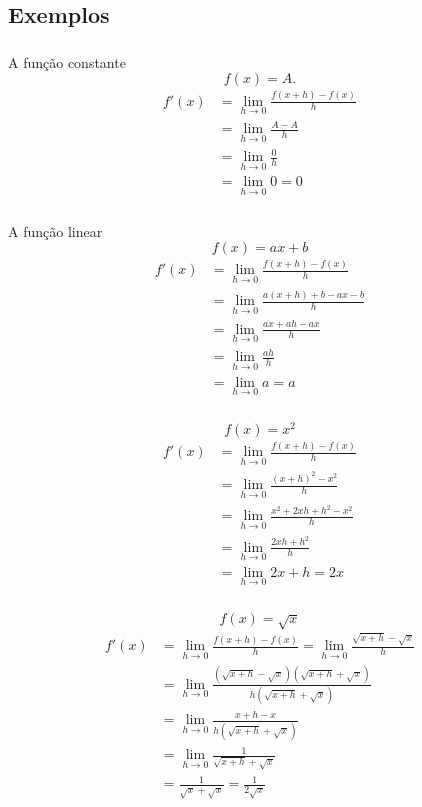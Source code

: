 \documentclass[10 pt]{beamer}
\newcommand{\myframe}[1]{
\begin{frame}
 \frametitle{\insertsection \qquad {\small \insertsubsection}}
#1
\end{frame}}
\newcommand{\limh}[1]{\lim_{h\rightarrow{#1}}}
\begin{document}
\subsection{Exemplos}

\myframe {
  A função constante
  $$ f(x) = A. $$
  \vspace{0.5cm}
  \begin{align*}
    f'(x) & = \limh{0}\frac{f(x+h)-f(x)}{h} \\
      & = \limh{0}\frac{A-A}{h} \\
      & = \limh{0}\frac{0}{h} \\
      & = \limh{0}0 = 0
  \end{align*}
}

\myframe {
  A função linear
  $$ f(x) = ax + b $$
  \vspace{0.5cm}
  \begin{align*}
    f'(x) & = \limh{0}\frac{f(x+h)-f(x)}{h} \\
      & = \limh{0}\frac{a(x+h)+b - ax-b}{h} \\
      & = \limh{0}\frac{ax+ah-ax}{h} \\
      & = \limh{0}\frac{ah}{h} \\
      & = \limh{0}a = a
  \end{align*}
}

\myframe {
  $$ f(x) = x^2 $$
  \vspace{0.5cm}
  \begin{align*}
    f'(x) & = \limh{0}\frac{f(x+h)-f(x)}{h} \\
      & = \limh{0}\frac{(x+h)^2 - x^2}{h} \\
      & = \limh{0}\frac{x^2+2xh+h^2 - x^2}{h} \\
      & = \limh{0}\frac{2xh + h^2}{h} \\
      & = \limh{0}2x + h = 2x
  \end{align*}
}

\myframe {
  $$ f(x) = \sqrt{x} $$
  \vspace{0.5cm}
  \begin{align*}
    f'(x) & = \limh{0}\frac{f(x+h)-f(x)}{h} = \limh{0}\frac{\sqrt{x+h}-\sqrt{x}}{h} \\
      & = \limh{0}\frac{(\sqrt{x+h}-\sqrt{x})(\sqrt{x+h}+\sqrt{x})}{h(\sqrt{x+h}+\sqrt{x})} \\
      & = \limh{0}\frac{x+h - x}{h(\sqrt{x+h}+\sqrt{x})} \\
      & = \limh{0}\frac{1}{\sqrt{x+h} + \sqrt{x}} \\
      & = \frac{1}{\sqrt{x}+\sqrt{x}} = \frac{1}{2\sqrt{x}}
  \end{align*}
}
\end{document}
